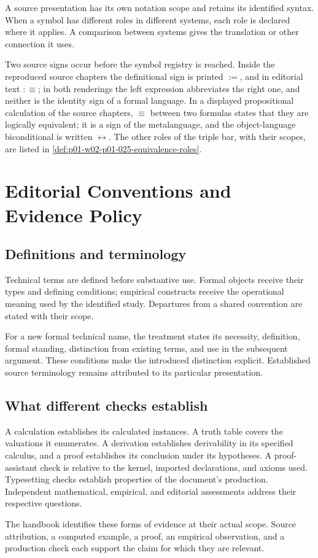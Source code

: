 A source presentation has its own notation scope and retains its
identified syntax. When a symbol has different roles in different
systems, each role is declared where it applies. A comparison between
systems gives the translation or other connection it uses.

Two source signs occur before the symbol registry is reached. Inside the
reproduced source chapters the definitional sign is printed \(\mathrel{:=}\),
and in editorial text \(\mathrel{:\equiv}\); in both renderings the left
expression abbreviates the right one, and neither is the identity sign of a
formal language. In a displayed propositional calculation of the source
chapters, \(\equiv\) between two formulas states that they are logically
equivalent; it is a sign of the metalanguage, and the object-language
biconditional is written \(\leftrightarrow\). The other roles of the triple bar,
with their scopes, are listed in
\cref{def:p01-w02-p01-025-equivalence-roles}.

\chapter*{Editorial Conventions and Evidence Policy}

\section*{Definitions and terminology}

Technical terms are defined before substantive use. Formal objects
receive their types and defining conditions; empirical constructs receive
the operational meaning used by the identified study.
Departures from a shared convention are stated with their scope.

For a new formal technical name, the treatment states its necessity,
definition, formal standing, distinction from existing terms, and use
in the subsequent argument. These conditions make the introduced
distinction explicit. Established source terminology remains attributed
to its particular presentation.

\section*{What different checks establish}

A calculation establishes its calculated instances. A truth table covers
the valuations it enumerates. A derivation establishes derivability in
its specified calculus, and a proof establishes its conclusion under its
hypotheses. A proof-assistant check is relative to the kernel, imported
declarations, and axioms used. Typesetting checks establish properties of
the document's production. Independent mathematical, empirical, and
editorial assessments address their respective questions.

The handbook identifies these forms of evidence at their actual scope.
Source attribution, a computed example, a proof, an empirical observation,
and a production check each support the claim for which they are relevant.
